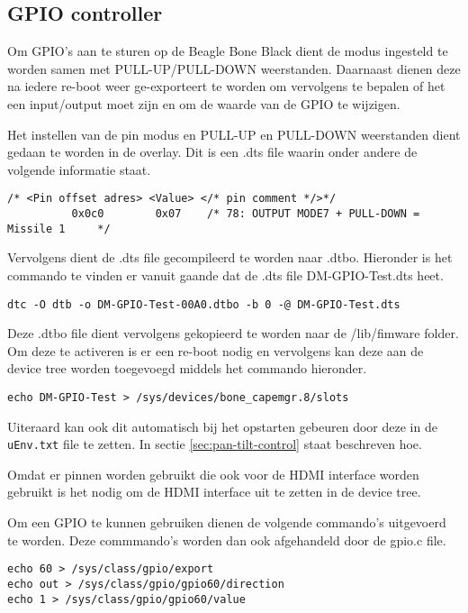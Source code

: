 \subsection{GPIO controller}
\label{sec:gpio}

Om GPIO's aan te sturen op de Beagle Bone Black dient de modus ingesteld te worden
samen met PULL-UP/PULL-DOWN weerstanden. Daarnaast dienen deze na iedere re-boot
weer ge-exporteert te worden om vervolgens te bepalen of het een input/output moet
zijn en om de waarde van de GPIO te wijzigen.

Het instellen van de pin modus en PULL-UP en PULL-DOWN weerstanden dient gedaan te
worden in de overlay. Dit is een .dts file waarin onder andere de volgende informatie
staat.

\begin{verbatim}
/* <Pin offset adres> <Value> </* pin comment */>*/
          0x0c0        0x07    /* 78: OUTPUT MODE7 + PULL-DOWN = Missile 1     */
\end{verbatim}

Vervolgens dient de .dts file gecompileerd te worden naar .dtbo. Hieronder is het
commando te vinden er vanuit gaande dat de .dts file DM-GPIO-Test.dts heet.

\begin{verbatim}
dtc -O dtb -o DM-GPIO-Test-00A0.dtbo -b 0 -@ DM-GPIO-Test.dts
\end{verbatim}

Deze .dtbo file dient vervolgens gekopieerd te worden naar de /lib/fimware folder.
Om deze te activeren is er een re-boot nodig en vervolgens kan deze aan de device
tree worden toegevoegd middels het commando hieronder.

\begin{verbatim}
echo DM-GPIO-Test > /sys/devices/bone_capemgr.8/slots
\end{verbatim}

Uiteraard kan ook dit automatisch bij het opstarten gebeuren door deze in de
\texttt{uEnv.txt} file te zetten. In sectie \ref{sec:pan-tilt-control} staat
beschreven hoe.

Omdat er pinnen worden gebruikt die ook voor de HDMI interface worden gebruikt
is het nodig om de HDMI interface uit te zetten in de device tree.

Om een GPIO te kunnen gebruiken dienen de volgende commando's uitgevoerd te worden.
Deze commmando's worden dan ook afgehandeld door de gpio.c file.

\begin{verbatim}
echo 60 > /sys/class/gpio/export
echo out > /sys/class/gpio/gpio60/direction
echo 1 > /sys/class/gpio/gpio60/value
\end{verbatim}

